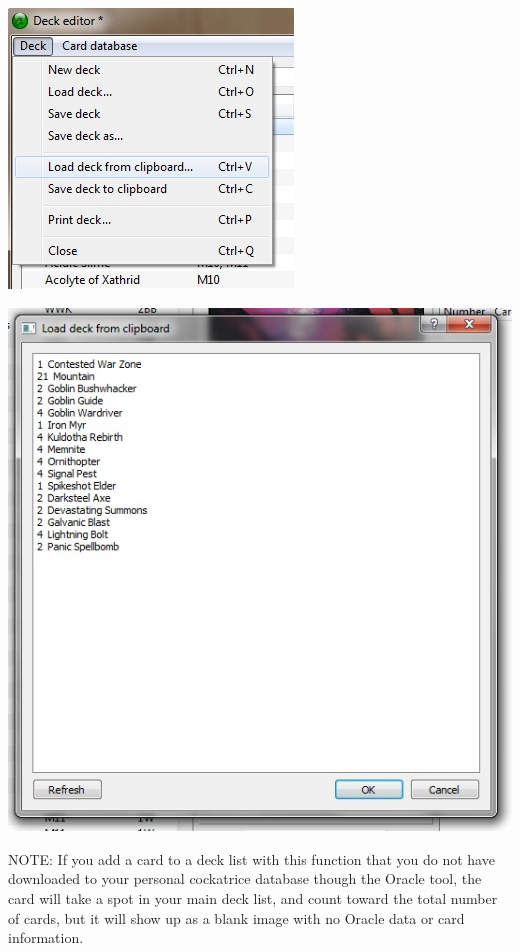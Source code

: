 \documentclass[a4paper]{scrbook}
\begin{document}
\begin{center}
\includegraphics{pics/loaddeck_clip}
\end{center}

\begin{center}
\includegraphics{pics/okdecklist}
\end{center}

NOTE: If you add a card to a deck list with this function that you do not have downloaded to your personal cockatrice database though the Oracle tool, the card will take a spot in your main deck list, and count toward the total number of cards, but it will show up as a blank image with no Oracle data or card information.
\end{document}
